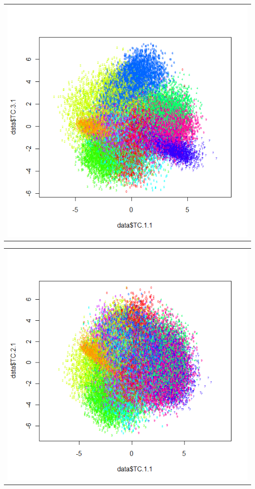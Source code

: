 \begin{table}[h!]
\begin{subtable}{.5\linewidth}
\begin{tabular}{c}
	\includegraphics[scale=0.4]{exp5/AllVsAll/PLS-13}
\end{tabular}
\end{subtable}
\begin{subtable}{.5\linewidth}
\begin{tabular}{c}
	\includegraphics[scale=0.4]{exp5/AllVsAll/PLS-12}
\end{tabular}
\end{subtable}
\end{table}

